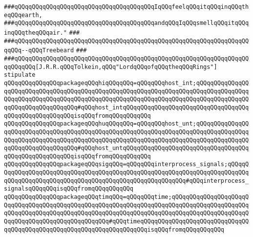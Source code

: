 \verb|###qQQqqQQqqQQqqQQqqQQqqQQqqQQqqQQqqQQqqQQqIqQQqfeelqQQqitqQQqinqQQqtheqQQqearth,|\newline
\verb|###qQQqqQQqqQQqqQQqqQQqqQQqqQQqqQQqqQQqqQQqandqQQqIqQQqsmellqQQqitqQQqinqQQqtheqQQqair."|\newline
\verb|###|\newline
\verb|###qQQqqQQqqQQqqQQqqQQqqQQqqQQqqQQqqQQqqQQqqQQqqQQqqQQqqQQqqQQqqQQqqQQqqQQq--qQQqTreebeard|\newline
\verb|###|\newline
\verb|###qQQqqQQqqQQqqQQqqQQqqQQqqQQqqQQqqQQqqQQqqQQqqQQqqQQqqQQqqQQqqQQqqQQqqQQqqQQq[J.R.R.qQQqTolkein,qQQq"LordqQQqofqQQqtheqQQqRings"]|\newline
\newline
\newline
\newline
\verb|stipulate|\newline
\verb|qQQqqQQqqQQqqQQqpackageqQQqhiqQQqqQQq=qQQqqQQqhost_int;qQQqqQQqqQQqqQQqqQQqqQQqqQQqqQQqqQQqqQQqqQQqqQQqqQQqqQQqqQQqqQQqqQQqqQQqqQQqqQQqqQQqqQQqqQQqqQQqqQQqqQQqqQQqqQQqqQQqqQQqqQQqqQQqqQQqqQQqqQQqqQQqqQQqqQQqqQQqqQQqqQQqqQQqqQQqqQQq#qQQqhost_intqQQqqQQqqQQqqQQqqQQqqQQqqQQqqQQqqQQqqQQqqQQqqQQqqQQqqQQqisqQQqfromqQQqqQQqqQQq|\newline
\verb|qQQqqQQqqQQqqQQqpackageqQQqhuqQQqqQQq=qQQqqQQqhost_unt;qQQqqQQqqQQqqQQqqQQqqQQqqQQqqQQqqQQqqQQqqQQqqQQqqQQqqQQqqQQqqQQqqQQqqQQqqQQqqQQqqQQqqQQqqQQqqQQqqQQqqQQqqQQqqQQqqQQqqQQqqQQqqQQqqQQqqQQqqQQqqQQqqQQqqQQqqQQqqQQqqQQqqQQqqQQqqQQq#qQQqhost_untqQQqqQQqqQQqqQQqqQQqqQQqqQQqqQQqqQQqqQQqqQQqqQQqqQQqqQQqisqQQqfromqQQqqQQqqQQq|\newline
\verb|qQQqqQQqqQQqqQQqpackageqQQqsigqQQq=qQQqqQQqinterprocess_signals;qQQqqQQqqQQqqQQqqQQqqQQqqQQqqQQqqQQqqQQqqQQqqQQqqQQqqQQqqQQqqQQqqQQqqQQqqQQqqQQqqQQqqQQqqQQqqQQqqQQqqQQqqQQqqQQqqQQqqQQqqQQqqQQq#qQQqinterprocess_signalsqQQqqQQqisqQQqfromqQQqqQQqqQQq|\newline
\verb|qQQqqQQqqQQqqQQqpackageqQQqtimqQQq=qQQqqQQqtime;qQQqqQQqqQQqqQQqqQQqqQQqqQQqqQQqqQQqqQQqqQQqqQQqqQQqqQQqqQQqqQQqqQQqqQQqqQQqqQQqqQQqqQQqqQQqqQQqqQQqqQQqqQQqqQQqqQQqqQQqqQQqqQQqqQQqqQQqqQQqqQQqqQQqqQQqqQQqqQQqqQQqqQQqqQQqqQQqqQQqqQQqqQQqqQQq#qQQqtimeqQQqqQQqqQQqqQQqqQQqqQQqqQQqqQQqqQQqqQQqqQQqqQQqqQQqqQQqqQQqqQQqqQQqqQQqisqQQqfromqQQqqQQqqQQq|\newline
